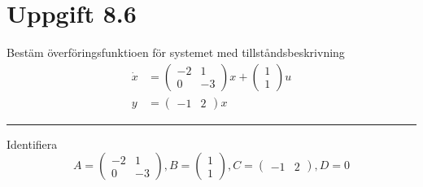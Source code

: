 \documentclass[12pt]{article}
\newcommand{\qline}{\hrule \vspace*{10pt}}
\begin{document}
\section*{Uppgift 8.6}
Bestäm överföringsfunktioen för systemet med tillståndsbeskrivning
\begin{align*}
  \dot{x} &=
            \begin{pmatrix}
              -2 & 1 \\
              0 & -3
            \end{pmatrix}x +
                  \begin{pmatrix}
                    1 \\
                    1
                  \end{pmatrix}u \\
  y &=
      \begin{pmatrix}
        -1 & 2
      \end{pmatrix}x
\end{align*}
\qline
Identifiera
\begin{equation*}
  A = \begin{pmatrix}
              -2 & 1 \\
              0 & -3
            \end{pmatrix}, B =
            \begin{pmatrix}
              1 \\
              1
            \end{pmatrix}, C =
            \begin{pmatrix}
              -1 & 2
            \end{pmatrix}, D = 0
\end{equation*}
\end{document}
